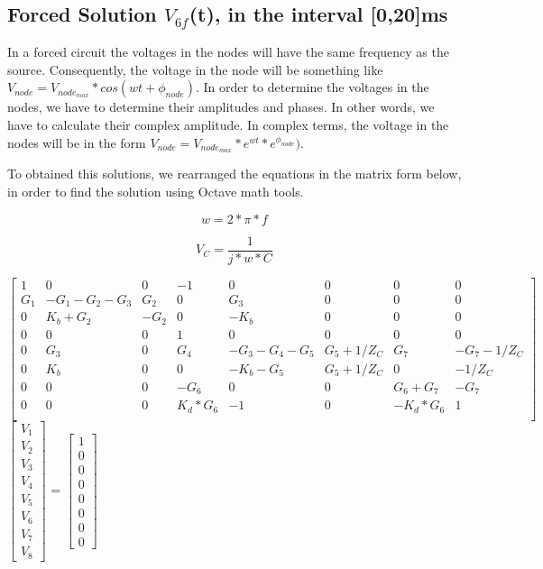 \subsection{Forced Solution $V_{6f}$(t), in the interval [0,20]ms}

\par In a forced circuit the voltages in the nodes will have the same frequency as the source. Consequently, the voltage in the node will be something like $V_{node} = V_{node_{max}}*cos(wt + \phi_{node})$. In order to determine the voltages in the nodes, we have to determine their amplitudes and phases. In other words, we have to calculate their complex amplitude. In complex terms, the voltage in the nodes will be in the form $V_{node} =
V_{node_{max}}*e^{wt}*e^{\phi_{node}})$.

\par To obtained this solutions, we rearranged the equations in the matrix form below, in order to find the solution using Octave math tools.

\begin{equation}
    w= 2*\pi*f
\end{equation}

\begin{equation}
    V_C = \frac{1}{j*w*C}
\end{equation}

$\begin{bmatrix}
1 & 0 & 0 & -1 & 0 & 0 & 0 & 0 \\
G_1 & -G_1-G_2-G_3 & G_2 & 0 & G_3 & 0 & 0 & 0\\
0 & K_b+G_2 & -G_2 & 0 & -K_b & 0 & 0 & 0\\
0 & 0 & 0 & 1 & 0 & 0 & 0 & 0\\
0 & G_3 & 0 & G_4 & -G_3-G_4-G_5 & G_5+1/Z_C & G_7 & -G_7-1/Z_C\\
0 & K_b & 0 & 0 & -K_b-G_5 & G_5+1/Z_C & 0 & -1/Z_C\\
0 & 0 & 0 & -G_6 & 0 & 0 & G_6+G_7 & -G_7\\
0 & 0 & 0 & K_d*G_6 & -1 & 0 & -K_d*G_6 & 1\\
\end{bmatrix}$
$\begin{bmatrix}
V_1 \\ V_2 \\ V_3 \\ V_4 \\ V_5 \\ V_6 \\ V_7 \\ V_8
\end{bmatrix}$
= 
$\begin{bmatrix}
1 \\ 0 \\ 0 \\ 0 \\ 0 \\ 0 \\ 0 \\ 0
\end{bmatrix}$

